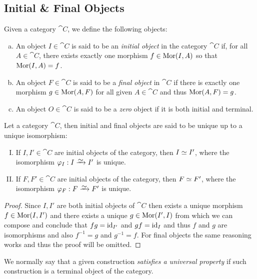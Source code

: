 \subsection{Initial \& Final Objects}

\begin{definition}
\label{def: initial and final objects}
Given a category \(\cat C\), we define the following objects:
\begin{enumerate}[(a)]\setlength\itemsep{0em}
\item An object \(I \in \cat C\) is said to be an \emph{initial object} in the
  category \(\cat{C}\) if, for all \(A \in \cat C\), there exists exactly one
  morphism \(f \in \operatorname{Mor}(I, A)\) so that \(\operatorname{Mor}(I, A) = f\).
\item An object \(F \in \cat C\) is said to be a \emph{final object} in \(\cat
  C\) if there is exactly one morphism \(g \in \operatorname{Mor}(A, F)\) for all given \(A \in
  \cat C\) and thus \(\operatorname{Mor}(A, F) = g\).
\item An object \(O \in \cat C\) is said to be a \emph{zero} object if it is both
  initial and terminal.
\end{enumerate}
\end{definition}

\begin{proposition}\label{prop:initial-final-unique}
Let a category \(\cat{C}\), then initial and final objects are said to be
unique up to a unique isomorphism:
\begin{enumerate}[I.]
\item If \(I, I' \in \cat{C}\) are initial objects of the
    category, then \(I \simeq I'\), where the isomorphism \(\varphi_I: I
    \isoto I'\) is unique.
\item If \(F, F' \in \cat{C}\) are initial objects of the
    category, then \(F \simeq F'\), where the isomorphism \(\varphi_F: F
    \isoto F'\) is unique.
\end{enumerate}
\end{proposition}

\begin{proof}
Since \(I, I'\) are both initial objects of \(\cat{C}\) then exists a unique
morphism \(f \in \operatorname{Mor}(I, I')\) and there exists a unique \(g \in \operatorname{Mor}(I',
I)\) from which we can compose and conclude that \(f g = \operatorname{id}_{I'}\) and \(gf =
\operatorname{id}_{I}\) and thus \(f\) and \(g\) are isomorphisms and also \(f^{-1} = g\) and
\(g^{-1} = f\).  For final objects the same reasoning works and thus the proof
will be omitted.
\end{proof}

We normally say that a given construction \emph{satisfies a universal property}
if such construction is a terminal object of the category.